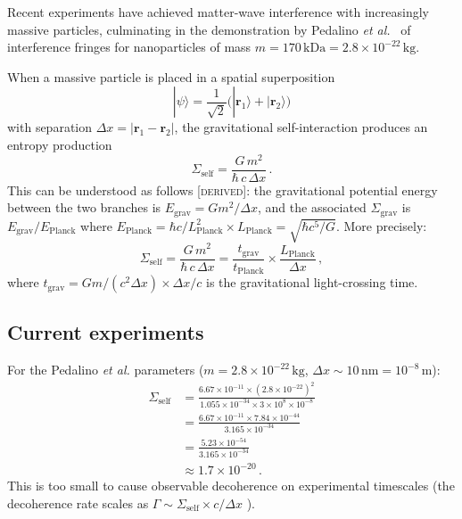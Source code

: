 \documentclass[prd,twocolumn,superscriptaddress,longbibliography,floatfix]{revtex4-2}
\newcommand{\ket}[1]{|#1\rangle}
\newcommand{\Sgrav}{\Sigma_{\mathrm{grav}}}
\newcommand{\derived}{\textsc{[derived]}}
\begin{document}
Recent experiments have achieved matter-wave interference with
increasingly massive particles, culminating in the demonstration
by Pedalino \textit{et al.}~\cite{Pedalino2026} of interference
fringes for nanoparticles of mass $m = 170\,\mathrm{kDa}
= 2.8 \times 10^{-22}\,\mathrm{kg}$.

When a massive particle is placed in a spatial superposition
\begin{equation}
  \ket{\psi} = \frac{1}{\sqrt{2}}
  \bigl(\ket{\bm{r}_1} + \ket{\bm{r}_2}\bigr)
  \label{eq:superposition}
\end{equation}
with separation $\Delta x = |\bm{r}_1 - \bm{r}_2|$, the
gravitational self-interaction produces an entropy production
\begin{equation}
  \Sigma_{\mathrm{self}} = \frac{G\,m^2}{\hbar\,c\,\Delta x}\,.
  \label{eq:sigma-self}
\end{equation}
This can be understood as follows \derived: the gravitational potential
energy between the two branches is $E_{\mathrm{grav}} = G m^2/\Delta x$,
and the associated $\Sgrav$ is $E_{\mathrm{grav}}/E_{\mathrm{Planck}}$
where $E_{\mathrm{Planck}} = \hbar c / L_{\mathrm{Planck}}^2 \times L_{\mathrm{Planck}}
= \sqrt{\hbar c^5/G}$.  More precisely:
\begin{equation}
  \Sigma_{\mathrm{self}} = \frac{G\,m^2}{\hbar\,c\,\Delta x}
  = \frac{t_{\mathrm{grav}}}{t_{\mathrm{Planck}}} \times
  \frac{L_{\mathrm{Planck}}}{\Delta x}\,,
  \label{eq:sigma-self-interpret}
\end{equation}
where $t_{\mathrm{grav}} = Gm/(c^2 \Delta x) \times \Delta x/c$ is
the gravitational light-crossing time.

\subsection{Current experiments}

For the Pedalino \textit{et al.} parameters
($m = 2.8 \times 10^{-22}\,\mathrm{kg}$,
$\Delta x \sim 10\,\mathrm{nm} = 10^{-8}\,\mathrm{m}$):
\begin{align}
  \Sigma_{\mathrm{self}} &=
  \frac{6.67 \times 10^{-11} \times (2.8 \times 10^{-22})^2}
  {1.055 \times 10^{-34} \times 3 \times 10^8 \times 10^{-8}}
  \nonumber \\
  &= \frac{6.67 \times 10^{-11} \times 7.84 \times 10^{-44}}
  {3.165 \times 10^{-34}}
  \nonumber \\
  &= \frac{5.23 \times 10^{-54}}{3.165 \times 10^{-34}}
  \nonumber \\
  &\approx 1.7 \times 10^{-20}\,.
  \label{eq:sigma-current}
\end{align}
This is too small to cause observable decoherence on experimental
timescales (the decoherence rate scales as
$\Gamma \sim \Sigma_{\mathrm{self}} \times c/\Delta x$
\cite{Diosi1989,Penrose1996}).
\end{document}
